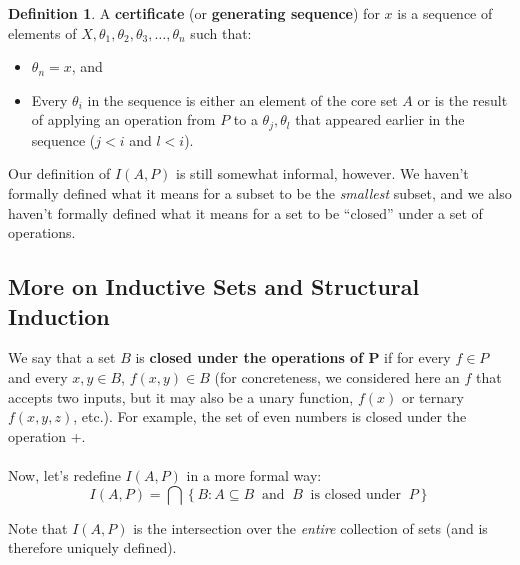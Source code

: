 \documentclass[]{article}
\theoremstyle{definition}
\newtheorem*{defn}{Definition}
\newcommand{\lecture}[1]{\marginpar{{\footnotesize $\leftarrow$ \underline{#1}}}}
\begin{document}
\begin{enumerate}
          \begin{defn}
            A \textbf{certificate} (or \textbf{generating sequence}) for $x$ is a sequence of elements of $X, \theta_1, \theta_2, \theta_3, \ldots, \theta_n$ such that:
            \begin{itemize}
              \item $\theta_n = x$, and
              \item Every $\theta_i$ in the sequence is either an element of the core set $A$ or is the result of applying an operation from $P$ to a $\theta_j, \theta_l$ that appeared earlier in the sequence ($j < i$ and $l < i$). \lecture{September 12, 2013}
            \end{itemize}
          \end{defn}
        \end{enumerate}

        Our definition of $I(A, P)$ is still somewhat informal, however. We haven't formally defined what it means for a subset to be the \emph{smallest} subset, and we also haven't formally defined what it means for a set to be ``closed'' under a set of operations.

        \subsection{More on Inductive Sets and Structural Induction}
        We say that a set $B$ is \textbf{closed under the operations of $\boldsymbol P$} if for every $f \in P$ and every $x, y \in B$, $f(x, y) \in B$ (for concreteness, we considered here an $f$ that accepts two inputs, but it may also be a unary function, $f(x)$ or ternary $f(x,y, z)$, etc.). For example, the set of even numbers is closed under the operation +.
        \\ \\
        Now, let's redefine $I(A, P)$ in a more formal way:
        $$
          I(A, P) = \bigcap \left\{ B : A \subseteq B ~\text{ and } ~B ~\text{ is closed under } ~P \right\}
        $$

        Note that $I(A, P)$ is the intersection over the \emph{entire} collection of sets (and is therefore uniquely defined).
\end{document}

